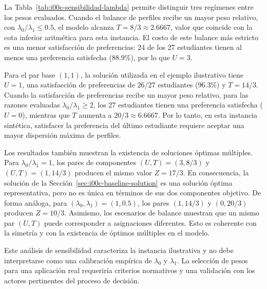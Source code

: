 

La Tabla~\ref{tab:i00c-sensibilidad-lambda} permite distinguir tres regímenes
entre los pesos evaluados. Cuando el balance de perfiles recibe un mayor peso
relativo, con $\lambda_0/\lambda_1\leq0.5$, el modelo alcanza
$T=8/3\approx2.6667$, valor que coincide con la cota inferior aritmética para
esta instancia. El costo de este balance más estricto es una menor satisfacción
de preferencias: 24 de los 27 estudiantes tienen al menos una preferencia
satisfecha ($88.9\%$), por lo que $U=3$.

Para el par base $(1,1)$, la solución utilizada en el ejemplo ilustrativo tiene
$U=1$, una satisfacción de preferencias de $26/27$ estudiantes ($96.3\%$) y
$T=14/3$. Cuando la satisfacción de preferencias recibe un mayor peso relativo,
para las razones evaluadas $\lambda_0/\lambda_1\geq2$, los 27 estudiantes tienen
una preferencia satisfecha ($U=0$), mientras que $T$ aumenta a
$20/3\approx6.6667$. Por lo tanto, en esta instancia sintética, satisfacer la
preferencia del último estudiante requiere aceptar una mayor dispersión máxima
de perfiles.

Los resultados también muestran la existencia de soluciones óptimas múltiples.
Para $\lambda_0/\lambda_1=1$, los pares de componentes
$(U,T)=(3,8/3)$ y $(U,T)=(1,14/3)$ producen el mismo valor $Z=17/3$. En
consecuencia, la solución de la
Sección~\ref{sec:i00c-baseline-solution} es una solución óptima representativa,
pero no es única en términos de sus dos componentes objetivo. De forma análoga,
para $(\lambda_0,\lambda_1)=(1,0.5)$, los pares $(1,14/3)$ y $(0,20/3)$
producen $Z=10/3$. Asimismo, los escenarios de balance muestran que un mismo
par $(U,T)$ puede corresponder a asignaciones diferentes. Esto es coherente con
la simetría y con la existencia de óptimos múltiples en el modelo.

Este análisis de sensibilidad caracteriza la instancia ilustrativa y no debe
interpretarse como una calibración empírica de $\lambda_0$ y $\lambda_1$. La
selección de pesos para una aplicación real requeriría criterios normativos y
una validación con los actores pertinentes del proceso de decisión.
